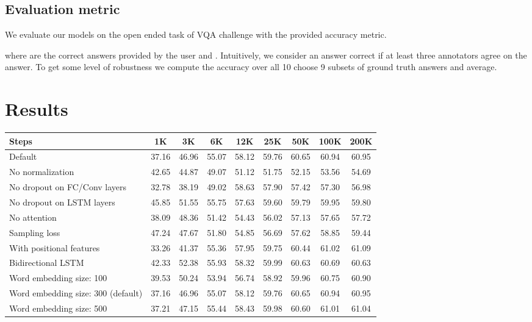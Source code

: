 \documentclass[10pt,twocolumn,letterpaper]{article}
\begin{document}
\subsection{Evaluation metric}
We evaluate our models on the open ended task of VQA challenge with the provided accuracy metric.

where  are the correct answers provided by the user and . Intuitively, we consider an answer correct if at least three annotators agree on the answer. To get some level of robustness we compute the accuracy over all 10 choose 9 subsets of ground truth answers and average.

\section{Results}

\begin{table*}
	\footnotesize
	\centering
	\tabcolsep=0.5cm
	\begin{tabular}{l c c c c c c c c}
		\toprule
		Steps &  1K & 3K & 6K & 12K & 25K & 50K & 100K & 200K \\
		\midrule
		Default & 37.16 & 46.96 & 55.07 & 58.12 & 59.76 & 60.65 & 60.94 & 60.95 \\
		No  normalization & 42.65 & 44.87 & 49.07 & 51.12 & 51.75 & 52.15 & 53.56 & 54.69 \\
		No dropout on FC/Conv layers & 32.78 & 38.19 & 49.02 & 58.63 & 57.90 & 57.42 & 57.30 & 56.98 \\
		No dropout on LSTM layers & 45.85 & 51.55 & 55.75 & 57.63 & 59.60 & 59.79 & 59.95 & 59.80 \\
		No attention & 38.09 & 48.36 & 51.42 & 54.43 & 56.02 & 57.13 & 57.65 & 57.72 \\
		Sampling loss & 47.24 & 47.67 & 51.80 & 54.85 & 56.69 & 57.62 & 58.85 & 59.44 \\
		With positional features & 33.26 & 41.37 & 55.36 & 57.95 & 59.75 & 60.44 & 61.02 & 61.09 \\
		Bidirectional LSTM & 42.33 & 52.38 & 55.93 & 58.32 & 59.99 & 60.63 & 60.69 & 60.63 \\
		\midrule
		Word embedding size: 100 & 39.53 & 50.24 & 53.94 & 56.74 & 58.92 & 59.96 & 60.75 & 60.90 \\
		Word embedding size: 300 (default) & 37.16 & 46.96 & 55.07 & 58.12 & 59.76 & 60.65 & 60.94 & 60.95 \\
		Word embedding size: 500 & 37.21 & 47.15 & 55.44 & 58.43 & 59.98 & 60.60 & 61.01 & 61.04 \\

\end{tabular}
\end{table*}
\end{document}
